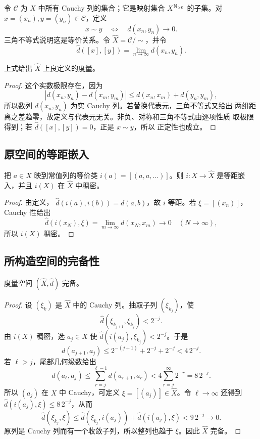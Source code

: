 令 \(\mathcal C\) 为 \(X\) 中所有 Cauchy 列的集合；它是映射集合
\(X^{\mathbb{N}_{>0}}\) 的子集。对
\(x=(x_n),y=(y_n)\in\mathcal C\)，定义
\[
 x\sim y\quad\Longleftrightarrow\quad d(x_n,y_n)\to0.
\]
三角不等式说明这是等价关系。令
\(\widehat X=\mathcal C/{\sim}\)，并令
\[
 \widehat d([x],[y])=\lim_{n\to\infty}d(x_n,y_n).
\]

\begin{proposition}
\label{prop:completion-quotient-metric}
上式给出 \(\widehat X\) 上良定义的度量。
\end{proposition}

\begin{proof}
这个实数极限存在，因为
\[
 |d(x_n,y_n)-d(x_m,y_m)|
 \le d(x_n,x_m)+d(y_n,y_m),
\]
所以数列 \(d(x_n,y_n)\) 为实 Cauchy 列。若替换代表元，三角不等式又给出
两组距离之差趋零，故定义与代表元无关。非负、对称和三角不等式由逐项性质
取极限得到；若 \(\widehat d([x],[y])=0\)，正是 \(x\sim y\)，所以
正定性也成立。
\end{proof}

\subsection{原空间的等距嵌入}

\begin{proposition}
\label{prop:completion-dense-embedding}
把 \(a\in X\) 映到常值列的等价类 \(i(a)=[(a,a,\ldots)]\)。则
\(i:X\to\widehat X\) 是等距嵌入，并且 \(i(X)\) 在 \(\widehat X\)
中稠密。
\end{proposition}

\begin{proof}
由定义，
\(\widehat d(i(a),i(b))=d(a,b)\)，故 \(i\) 等距。若
\(\xi=[(x_n)]\)，Cauchy 性给出
\[
 \widehat d(i(x_N),\xi)=\lim_{m\to\infty}d(x_N,x_m)\longrightarrow0
 \quad(N\to\infty),
\]
所以 \(i(X)\) 稠密。
\end{proof}

\subsection{所构造空间的完备性}

\begin{proposition}
\label{prop:completion-space-complete}
度量空间 \((\widehat X,\widehat d)\) 完备。
\end{proposition}

\begin{proof}
设 \((\xi_k)\) 是 \(\widehat X\) 中的 Cauchy 列。抽取子列
\((\xi_{k_j})\)，使
\[
 \widehat d(\xi_{k_{j+1}},\xi_{k_j})<2^{-j}.
\]
由 \(i(X)\) 稠密，选 \(a_j\in X\) 使
\(\widehat d(i(a_j),\xi_{k_j})<2^{-j}\)。于是
\[
 d(a_{j+1},a_j)
 \le 2^{-(j+1)}+2^{-j}+2^{-j}<4\,2^{-j}.
\]
若 \(\ell>j\)，尾部几何级数给出
\[
 d(a_\ell,a_j)
 \le\sum_{r=j}^{\ell-1}d(a_{r+1},a_r)
 <4\sum_{r=j}^{\infty}2^{-r}=8\,2^{-j}.
\]
所以 \((a_j)\) 在 \(X\) 中 Cauchy，可定义
\(\xi=[(a_j)]\in\widehat X\)。令 \(\ell\to\infty\) 还得到
\(\widehat d(i(a_j),\xi)\le8\,2^{-j}\)，从而
\[
 \widehat d(\xi_{k_j},\xi)
 \le\widehat d(\xi_{k_j},i(a_j))
   +\widehat d(i(a_j),\xi)
 <9\,2^{-j}\longrightarrow0.
\]
原列是 Cauchy 列而有一个收敛子列，所以整列也趋于 \(\xi\)。因此
\(\widehat X\) 完备。
\end{proof}


